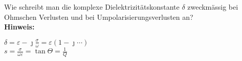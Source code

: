 \begin{question}[section=2,name={Dielektrizitätskonstante},difficulty=,quantity=1,type=thr,tags={}]
	Wie schreibt man die komplexe Dielektrizitätskonstante $\delta$ zweckmässig bei Ohmschen Verlusten und bei Umpolarisierungsverlusten an? 
	\\ \textbf{Hinweis:}\\
	
\end{question}
\begin{solution}
	$\delta=\varepsilon - \jmath \frac{\sigma}{\omega} = \varepsilon (1-\jmath \cdots)$\\
	$s=\frac{\sigma}{\omega\varepsilon}=\tan{\Theta}=\frac{1}{Q}$
\end{solution}